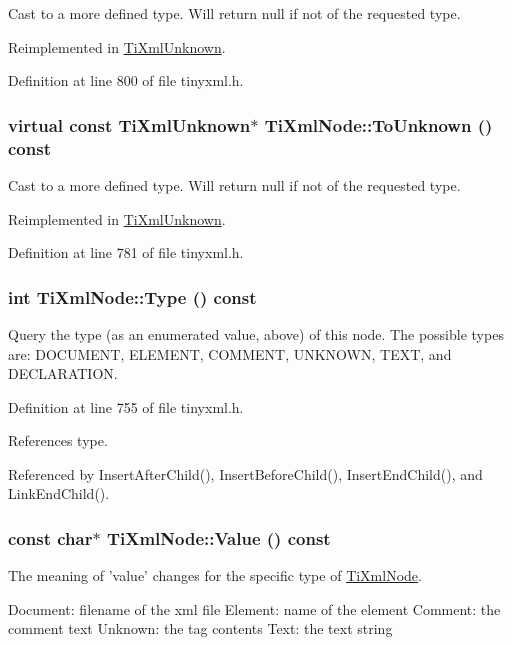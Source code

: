 Cast to a more defined type. Will return null if not of the requested type. 

Reimplemented in \hyperlink{class_ti_xml_unknown_a67c9fd22940e8c47f706a72cdd2e332c}{TiXmlUnknown}.

Definition at line 800 of file tinyxml.h.\hypertarget{class_ti_xml_node_afd7205cf31d7a376929f8a36930627a2}{
\subsubsection[{ToUnknown}]{\setlength{\rightskip}{0pt plus 5cm}virtual const {\bf TiXmlUnknown}$\ast$ TiXmlNode::ToUnknown () const}}
\label{class_ti_xml_node_afd7205cf31d7a376929f8a36930627a2}


Cast to a more defined type. Will return null if not of the requested type. 

Reimplemented in \hyperlink{class_ti_xml_unknown_ab0313e5fe77987d746ac1a97a254419d}{TiXmlUnknown}.

Definition at line 781 of file tinyxml.h.\hypertarget{class_ti_xml_node_a57b99d5c97d67a42b9752f5210a1ba5e}{
\subsubsection[{Type}]{\setlength{\rightskip}{0pt plus 5cm}int TiXmlNode::Type () const}}
\label{class_ti_xml_node_a57b99d5c97d67a42b9752f5210a1ba5e}
Query the type (as an enumerated value, above) of this node. The possible types are: DOCUMENT, ELEMENT, COMMENT, UNKNOWN, TEXT, and DECLARATION. 

Definition at line 755 of file tinyxml.h.

References type.

Referenced by InsertAfterChild(), InsertBeforeChild(), InsertEndChild(), and LinkEndChild().\hypertarget{class_ti_xml_node_a77943eb90d12c2892b1337a9f5918b41}{
\subsubsection[{Value}]{\setlength{\rightskip}{0pt plus 5cm}const char$\ast$ TiXmlNode::Value () const}}
\label{class_ti_xml_node_a77943eb90d12c2892b1337a9f5918b41}
The meaning of 'value' changes for the specific type of \hyperlink{class_ti_xml_node}{TiXmlNode}. \begin{DoxyVerb}
      Document: filename of the xml file
      Element:  name of the element
      Comment:  the comment text
      Unknown:  the tag contents
      Text:             the text string
      \end{DoxyVerb}


